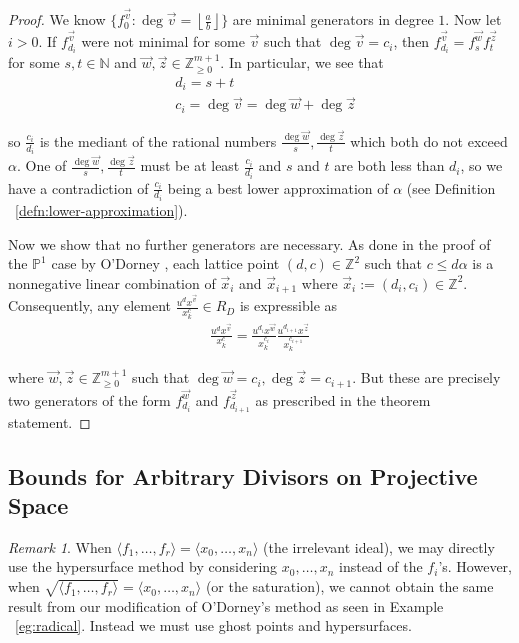 \documentclass{amsart}
\theoremstyle{plain}
\theoremstyle{definition}
\theoremstyle{remark}
\newtheorem{rem}[thm]{Remark}
\numberwithin{equation}{section}
\newcommand\ssec{\subsection}
\newcommand\bn{{\mathbb N}}
\newcommand\bp{{\mathbb P}}
\newcommand\bz{{\mathbb Z}}
\begin{document}
\begin{proof}
We know $\{f_{0}^{\vec{v}} : \deg \vec{v} = \left\lfloor \frac{a}{b}
\right\rfloor \}$ are minimal generators in degree $1$. Now let $i >
0$. If $f_{d_i}^{\vec{v}}$ were not minimal for some $\vec{v}$ such
that $\deg \vec{v} = c_i$, then $f_{d_i}^{\vec{v}} = f_{s}^{\vec{w}}
f_{t}^{\vec{z}}$ for some $s, t \in \bn$ and $\vec{w}, \vec{z} \in
\bz_{\geq 0}^{m + 1}$. In particular, we see that 
\begin{align*}
	&d_i = s + t \\
	&c_i = \deg \vec{v} = \deg \vec{w} + \deg \vec{z}
\end{align*}

\noindent
so $\frac{c_i}{d_i}$ is the mediant of the rational numbers
$\frac{\deg \vec{w}}{s}, \frac{\deg \vec{z}}{t}$ which both
do not exceed $\alpha$. One of $\frac{\deg \vec{w}}{s},
\frac{\deg \vec{z}}{t}$ must be at least $\frac{c_i}{d_i}$
and $s$ and $t$ are both less than $d_i$, so we have a contradiction 
of $\frac{c_i}{d_i}$ being a best lower approximation of $\alpha$
(see Definition ~\ref{defn:lower-approximation}).

Now we show that no further generators are necessary. As done in
the proof of the $\bp^1$ case by O'Dorney \cite[Theorem 6]
{dorney:canonical}, each lattice point $(d, c) \in \bz^2$ such that
$c \leq d \alpha$ is a nonnegative linear combination of $\vec{x}_i$
and $\vec{x}_{i + 1}$ where $\vec{x}_i := (d_i, c_i) \in \bz^2$.
Consequently, any element $\frac{u^{d} x^{\vec{v}}} {x_k^{c}} \in
R_D$ is expressible as
\begin{align*}
	\frac{u^{d} x^{\vec{v}}} {x_k^{c}} = \frac{u^{d_i} x^{\vec{w}}}
	{x_k^{c_i}} \frac{u^{d_{i + 1}} x^{\vec{z}}} {x_k^{c_{i + 1}}}
\end{align*}

\noindent
where $\vec{w}, \vec{z} \in \bz_{\geq 0}^{m + 1}$ such that $\deg
\vec{w} = c_i, \deg \vec{z} = c_{i + 1}$. But these are precisely
two generators of the form $f_{d_i}^{\vec{w}}$ and $f_{d_{i + 1}}
^{\vec{z}}$ as prescribed in the theorem statement.

\end{proof}



\ssec{Bounds for Arbitrary Divisors on Projective Space}

\begin{rem}
When $\langle f_1, \ldots, f_r \rangle = \langle x_0, \ldots, x_n \rangle$ (the irrelevant ideal), we may directly use the hypersurface method by considering $x_0, \ldots, x_n$ instead of the $f_i$'s. However, when $\sqrt{\langle f_1, \ldots, f_r \rangle} = \langle x_0, \ldots, x_n \rangle$ (or the saturation), we cannot obtain the same result from our modification of O'Dorney's method as seen in Example ~\ref{eg:radical}. Instead we must use ghost points and hypersurfaces.
\end{rem}
\end{document}
